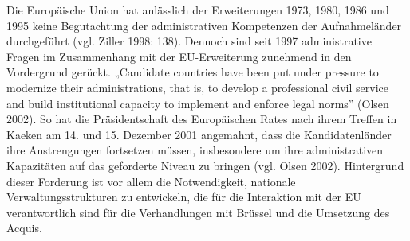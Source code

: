 Die Europäische Union hat anlässlich der Erweiterungen 1973, 1980, 1986 und 1995 keine Begutachtung der administrativen Kompetenzen der Aufnahmeländer durchgeführt (vgl. Ziller 1998: 138). Dennoch sind seit 1997 administrative Fragen im Zusammenhang mit der EU-Erweiterung zunehmend in den Vordergrund gerückt. „Candidate countries have been put under pressure to modernize their administrations, that is, to develop a professional civil service and build institutional capacity to implement and enforce legal norms” (Olsen 2002). So hat die Präsidentschaft des Europäischen Rates nach ihrem Treffen in Kaeken am 14. und 15. Dezember 2001 angemahnt, dass die Kandidatenländer ihre Anstrengungen fortsetzen müssen, insbesondere um ihre administrativen Kapazitäten auf das geforderte Niveau zu bringen (vgl. Olsen 2002). Hintergrund dieser Forderung ist vor allem die Notwendigkeit, nationale Verwaltungsstrukturen zu entwickeln, die für die Interaktion mit der EU verantwortlich sind für die Verhandlungen mit Brüssel und die Umsetzung des Acquis.

